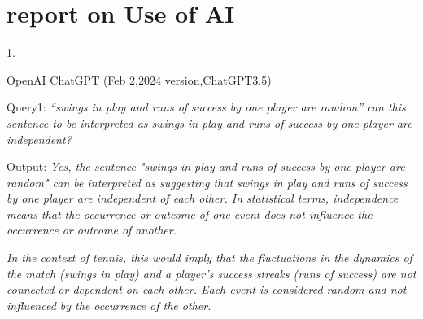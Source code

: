\section{report on Use of AI}

1.

OpenAI ChatGPT (Feb 2,2024 version,ChatGPT3.5)

Query1:  \emph{
    “swings in play and runs of success by one player are random” 
can this sentence to be interpreted as  swings in play and runs of success by one player are independent?
}

Output: \emph{Yes, the sentence "swings in play and runs of success by one player are random" 
can be interpreted as suggesting that swings in play and runs of success by one player are 
independent of each other. In statistical terms, independence means that the occurrence or 
outcome of one event does not influence the occurrence or outcome of another.}

\emph{
In the context of tennis, this would imply that the fluctuations in the dynamics of the match 
(swings in play) and a player's success streaks (runs of success) are not connected or dependent 
on each other. Each event is considered random and not influenced by the occurrence of the other.
}
